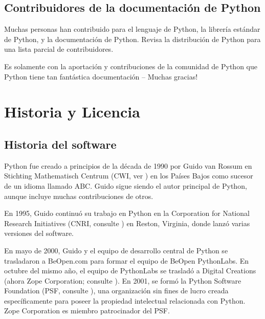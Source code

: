\documentclass[a4,10pt,spanish]{sphinxmanual}
\begin{document}
\section{Contribuidores de la documentación de Python}
\label{\detokenize{about:contributors-to-the-python-documentation}}
\sphinxAtStartPar
Muchas personas han contribuido para el lenguaje de Python, la librería estándar de Python, y la documentación de Python. Revisa  la distribución de Python para una lista parcial de contribuidores.

\sphinxAtStartPar
Es solamente con la aportación y contribuciones de la comunidad de Python que Python tiene tan fantástica documentación –  Muchas gracias!
\label{\detokenize{license::doc}}

\chapter{Historia y Licencia}
\label{\detokenize{license:history-and-license}}\label{\detokenize{license:id1}}

\section{Historia del software}
\label{\detokenize{license:history-of-the-software}}
\sphinxAtStartPar
Python fue creado a principios de la década de 1990 por Guido van Rossum en Stichting Mathematisch Centrum (CWI, ver ) en los Países Bajos como sucesor de un idioma llamado ABC. Guido sigue siendo el autor principal de Python, aunque incluye muchas contribuciones de otros.

\sphinxAtStartPar
En 1995, Guido continuó su trabajo en Python en la Corporation for National Research Initiatives (CNRI, consulte ) en Reston, Virginia, donde lanzó varias versiones del software.

\sphinxAtStartPar
En mayo de 2000, Guido y el equipo de desarrollo central de Python se trasladaron a BeOpen.com para formar el equipo de BeOpen PythonLabs. En octubre del mismo año, el equipo de PythonLabs se trasladó a Digital Creations (ahora Zope Corporation; consulte ). En 2001, se formó la Python Software Foundation (PSF, consulte ), una organización sin fines de lucro creada específicamente para poseer la propiedad intelectual relacionada con Python. Zope Corporation es miembro patrocinador del PSF.
\end{document}
